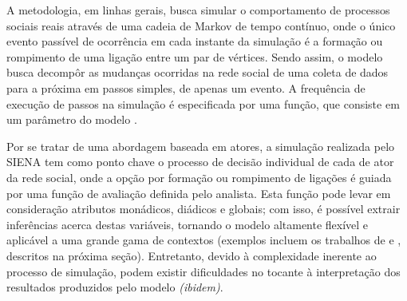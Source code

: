 A metodologia, em linhas gerais, busca simular o comportamento de processos sociais reais através de uma cadeia de Markov de tempo contínuo, onde o único evento passível de ocorrência em cada instante da simulação é a formação ou rompimento de uma ligação entre um par de vértices. Sendo assim, o modelo busca decompôr as mudanças ocorridas na rede social de uma coleta de dados para a próxima em passos simples, de apenas um evento. A frequência de execução de passos na simulação é especificada por uma função, que consiste em um parâmetro do modelo \cite{Borgatti2013}.

Por se tratar de uma abordagem baseada em atores, a simulação realizada pelo SIENA tem como ponto chave o processo de decisão individual de cada de ator da rede social, onde a opção por formação ou rompimento de ligações é guiada por uma função de avaliação definida pelo analista. Esta função pode levar em consideração atributos monádicos, diádicos e globais; com isso, é possível extrair inferências acerca destas variáveis, tornando o modelo altamente flexível e aplicável a uma grande gama de contextos (exemplos incluem os trabalhos de  e , descritos na próxima seção). Entretanto, devido à complexidade inerente ao processo de simulação, podem existir dificuldades no tocante à interpretação dos resultados produzidos pelo modelo \textit{(ibidem)}.



